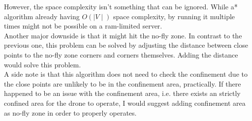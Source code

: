 \documentclass[a4paper,article,fontsize=15pt]{scrartcl}
\numberwithin{equation}{section}		%
\numberwithin{figure}{section}			%
\numberwithin{table}{section}				%
\begin{document}
However, the space complexity isn't something that can be ignored. While a* algorithm already having $O(\mid V \mid)$ space complexity, by running it multiple times might not be possible on a ram-limited server.\hfill \\

Another major downside is that it might hit the no-fly zone. In contrast to the previous one, this problem can be solved by adjusting the distance between close points to the no-fly zone corners and corners themselves. Adding the distance would solve this problem.\hfill \\

A side note is that this algorithm does not need to check the confinement due to the close points are unlikely to be in the confinement area, practically. If there happened to be an issue with the confinement area, i.e. there exists an strictly confined area for the drone to operate, I would suggest adding confinement area as no-fly zone in order to properly operates.

\newpage
\printbibliography %
\end{document}
